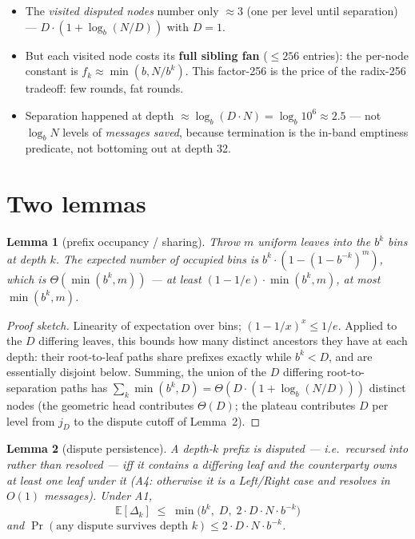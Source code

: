 \documentclass[11pt]{article}
\theoremstyle{plain}
\newtheorem{lemma}{Lemma}
\begin{document}
\begin{itemize}
\item The \emph{visited disputed nodes} number only $\approx 3$ (one per
  level until separation) --- $D \cdot (1 + \log_b(N/D))$ with $D = 1$.
\item But each visited node costs its \textbf{full sibling fan} ($\le 256$
  entries): the per-node constant is $f_k \approx \min(b, N/b^k)$. This
  factor-256 is the price of the radix-256 tradeoff: few rounds, fat rounds.
\item Separation happened at depth
  $\approx \log_b(D \cdot N) = \log_b 10^6 \approx 2.5$ --- not
  $\log_b N$ levels of \emph{messages saved}, because termination is the
  in-band emptiness predicate, not bottoming out at depth 32.
\end{itemize}

\section{Two lemmas}

\begin{lemma}[prefix occupancy / sharing]
Throw $m$ uniform leaves into the $b^k$ bins at depth $k$. The expected
number of occupied bins is $b^k \cdot (1 - (1 - b^{-k})^m)$, which is
$\Theta(\min(b^k, m))$ --- at least $(1 - 1/e) \cdot \min(b^k, m)$, at most
$\min(b^k, m)$.
\end{lemma}

\begin{proof}[Proof sketch]
Linearity of expectation over bins; $(1 - 1/x)^x \le 1/e$. Applied to the
$D$ differing leaves, this bounds how many distinct ancestors they have at
each depth: their root-to-leaf paths share prefixes exactly while
$b^k < D$, and are essentially disjoint below. Summing, the union of the
$D$ differing root-to-separation paths has
$\sum_k \min(b^k, D) = \Theta(D \cdot (1 + \log_b(N/D)))$ distinct nodes
(the geometric head contributes $\Theta(D)$; the plateau contributes $D$
per level from $j_D$ to the dispute cutoff of Lemma~2).
\end{proof}

\begin{lemma}[dispute persistence]
A depth-$k$ prefix is disputed --- i.e.\ recursed into rather than
resolved --- iff it contains a differing leaf \emph{and} the counterparty
owns at least one leaf under it (A4: otherwise it is a Left/Right case and
resolves in $O(1)$ messages). Under A1,
\begin{equation*}
\mathbb{E}[\Delta_k] \;\le\; \min\bigl( b^k,\; D,\; 2 \cdot D \cdot N \cdot b^{-k} \bigr)
\end{equation*}
and $\Pr(\text{any dispute survives depth } k) \le 2 \cdot D \cdot N \cdot b^{-k}$.
\end{lemma}
\end{document}
